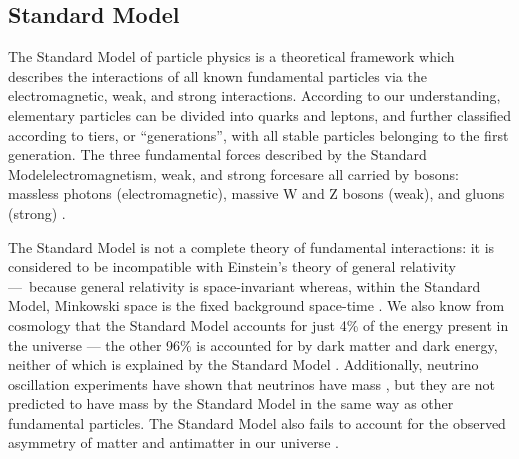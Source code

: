 \subsection{Standard Model}
The Standard Model of particle physics is a theoretical framework which describes the interactions of all known fundamental particles via the electromagnetic, weak, and strong interactions. According to our understanding, elementary particles can be divided into quarks and leptons, and further classified according to tiers, or ``generations'', with all stable particles belonging to the first generation. The three fundamental forces described by the Standard Model\textemdash electromagnetism, weak, and strong forces\textemdash are all carried by bosons: massless photons (electromagnetic), massive W and Z bosons (weak), and gluons (strong) \cite{CERN:SM:Online}.

The Standard Model is not a complete theory of fundamental interactions: it is considered to be incompatible with Einstein's theory of general relativity — because general relativity is space-invariant whereas, within the Standard Model, Minkowski space is the fixed background space-time \cite{Colosi:2005:CQG}. We also know from cosmology that the Standard Model accounts for just 4\% of the energy present in the universe — the other 96\% is accounted for by dark matter and dark energy, neither of which is explained by the Standard Model \cite{Krauss:2009:Conference}. Additionally, neutrino oscillation experiments have shown that neutrinos have mass \cite{Fukuda:1998:Kamiokande}, but they are not predicted to have mass by the Standard Model in the same way as other fundamental particles. The Standard Model also fails to account for the observed asymmetry of matter and antimatter in our universe \cite{Sather:1999:MatterA}.

